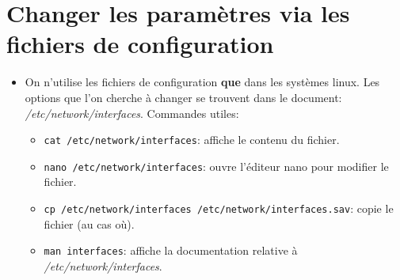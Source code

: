 \documentclass[a4paper]{article}
\renewcommand{\tt}{\texttt}
\begin{document}
\section{Changer les paramètres via les fichiers de configuration}





\begin{itemize}





\item On n'utilise les fichiers de configuration \textbf{que} dans les systèmes linux. Les options que l'on cherche à changer se trouvent dans le document: \textit{/etc/network/interfaces}. Commandes utiles:
\begin{itemize}
    \item \tt{cat /etc/network/interfaces}: affiche le contenu du fichier.
    \item \tt{nano /etc/network/interfaces}: ouvre l'éditeur nano pour modifier le fichier.
    \item \tt{cp /etc/network/interfaces /etc/network/interfaces.sav}: copie le fichier (au cas où).
    \item \tt{man interfaces}: affiche la documentation relative à \textit{/etc/network/interfaces}.
\end{itemize}






\end{itemize}
\end{document}
